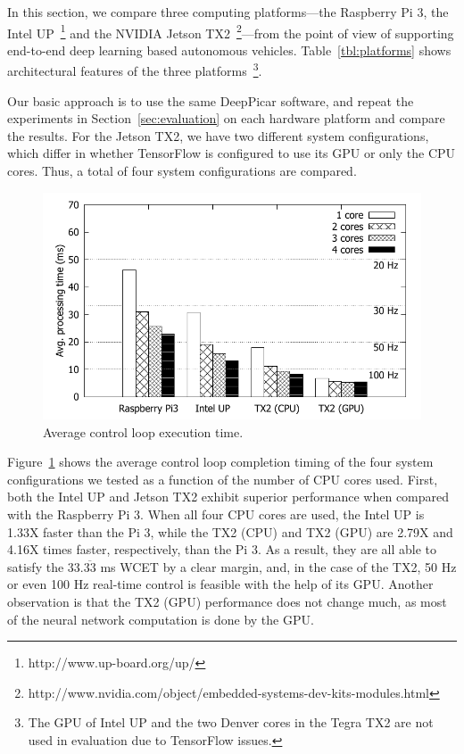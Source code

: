 In this section, we compare three computing platforms---the Raspberry
Pi 3, the Intel UP~\footnote{http://www.up-board.org/up/} and the NVIDIA
Jetson
TX2~\footnote{http://www.nvidia.com/object/embedded-systems-dev-kits-modules.html}---from
the point of view of supporting end-to-end deep learning
based autonomous vehicles. 
Table~\ref{tbl:platforms} shows architectural features of the three
platforms~\footnote{The GPU of Intel UP and the two Denver cores in the
  Tegra TX2 are not used in evaluation due to TensorFlow issues.}.
  
Our basic approach is to use the same DeepPicar software, and repeat
the experiments in Section~\ref{sec:evaluation} on each hardware
platform and compare the results. 
For the Jetson TX2, we have two different system configurations,
which differ in whether TensorFlow is configured to use its GPU or
only the CPU cores. Thus, a total of four system configurations are
compared.

\begin{figure}[h]
  \centering
  \includegraphics[width=.45\textwidth]{figs/compare_core}
  \caption{Average control loop execution time.} 
  \label{fig:sys_core}
\end{figure}

Figure~\ref{fig:sys_core} shows the average control loop completion
timing of the four system configurations we tested as a function of
the number of CPU cores used.
First, both the Intel UP and Jetson TX2 exhibit superior performance when
compared with the Raspberry Pi 3. 
When all four CPU cores are used, the Intel UP is 1.33X faster than
the Pi 3, while the TX2 (CPU) and TX2 (GPU) are 2.79X and 4.16X times faster,
respectively, than the Pi 3. 
As a result, they are all able to satisfy the 33.$\overline{\mbox{33}}$ ms 
WCET by a clear margin,
and, in the case of the TX2, 50 Hz or even 100 Hz real-time control is
feasible with the help of its GPU. Another observation is that the TX2
(GPU) performance does not change much, as most of the neural network 
computation is done by the GPU.

